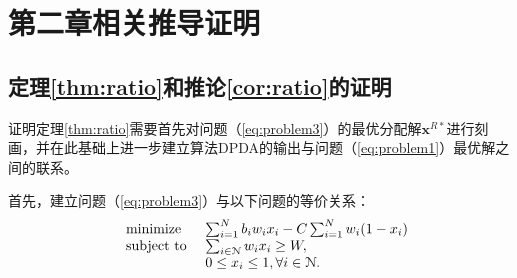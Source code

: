 \chapter{第二章相关推导证明}
\section{定理\ref{thm:ratio}和推论\ref{cor:ratio}的证明}\label{pf:thm:ratio}
证明定理\ref{thm:ratio}需要首先对问题（\ref{eq:problem3}）的最优分配解$\mathbf{x}^{R*}$进行刻画，并在此基础上进一步建立算法DPDA的输出与问题（\ref{eq:problem1}）最优解之间的联系。
	
	首先，建立问题（\ref{eq:problem3}）与以下问题的等价关系：
	\begin{equation}%
	\hspace{-0.0cm}
	\begin{array}
	[c]{lll}%
	&{\text{minimize}}&~\sum_{i=1}^{N}b_iw_ix_i-C\sum_{i=1}^{N}w_i(1-x_i)
	\\
	&\text{subject to}&~ \sum_{i\in\N}w_ix_i\ge W,\\
	&&~ 0\le x_i\le 1, \forall i\in\N.
	\end{array}
	\label{eq:problem4}
	\end{equation}
	
